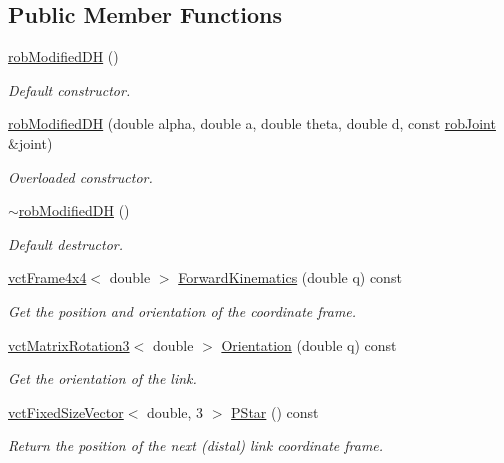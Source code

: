 \subsection*{Public Member Functions}
\begin{DoxyCompactItemize}
\item 
\hyperlink{classrob_modified_d_h_a9166dfe0206f859756ff39bdd416a746}{rob\+Modified\+D\+H} ()
\begin{DoxyCompactList}\small\item\em Default constructor. \end{DoxyCompactList}\item 
\hyperlink{classrob_modified_d_h_a81eecf344a9e299d14a5d6fdaaee3fed}{rob\+Modified\+D\+H} (double alpha, double a, double theta, double d, const \hyperlink{classrob_joint}{rob\+Joint} \&joint)
\begin{DoxyCompactList}\small\item\em Overloaded constructor. \end{DoxyCompactList}\item 
\hyperlink{classrob_modified_d_h_a382df42ece3ea09583a792305d925c59}{$\sim$rob\+Modified\+D\+H} ()
\begin{DoxyCompactList}\small\item\em Default destructor. \end{DoxyCompactList}\item 
\hyperlink{classvct_frame4x4}{vct\+Frame4x4}$<$ double $>$ \hyperlink{classrob_modified_d_h_a05b59134f01d068b6e03c54443efa0f9}{Forward\+Kinematics} (double q) const 
\begin{DoxyCompactList}\small\item\em Get the position and orientation of the coordinate frame. \end{DoxyCompactList}\item 
\hyperlink{classvct_matrix_rotation3}{vct\+Matrix\+Rotation3}$<$ double $>$ \hyperlink{classrob_modified_d_h_ae93da4e3532ede4f828053e6a19ddd8a}{Orientation} (double q) const 
\begin{DoxyCompactList}\small\item\em Get the orientation of the link. \end{DoxyCompactList}\item 
\hyperlink{classvct_fixed_size_vector}{vct\+Fixed\+Size\+Vector}$<$ double, 3 $>$ \hyperlink{classrob_modified_d_h_a9cc8c123b2a4274181f15356875aea9e}{P\+Star} () const 
\begin{DoxyCompactList}\small\item\em Return the position of the next (distal) link coordinate frame. \end{DoxyCompactList}\item 

\end{DoxyCompactItemize}
